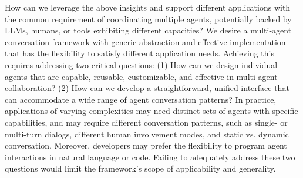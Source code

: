 How can we leverage the above insights and support different applications with the common requirement of coordinating multiple agents, potentially backed by LLMs, humans, or tools exhibiting different capacities? %
We desire a multi-agent conversation framework with generic abstraction and effective implementation that has the flexibility to satisfy different application needs.
Achieving this requires addressing two critical questions:
(1) How can we design individual agents that are capable, reusable, customizable, and effective in multi-agent collaboration? (2) How can we develop a straightforward, unified interface that can accommodate a wide range of agent conversation patterns? %
In practice, applications of varying complexities may need distinct sets of agents with specific capabilities, and may require different conversation patterns, such as single- or multi-turn dialogs, different human involvement modes, and static vs. dynamic conversation. Moreover, developers may prefer the flexibility to program agent interactions in natural language or code. Failing to adequately address these two questions would limit the framework's scope of applicability and generality.

